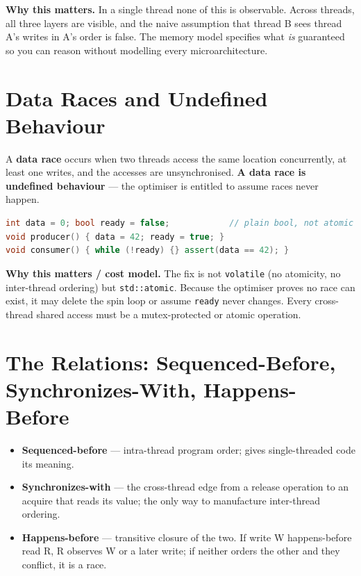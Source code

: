 \textbf{Why this matters.} In a single thread none of this is observable. Across threads, all three layers are visible, and the naive assumption that thread B sees thread A's writes in A's order is false. The memory model specifies what \emph{is} guaranteed so you can reason without modelling every microarchitecture.

\section{Data Races and Undefined Behaviour}
A \textbf{data race} occurs when two threads access the same location concurrently, at least one writes, and the accesses are unsynchronised. \textbf{A data race is undefined behaviour} --- the optimiser is entitled to assume races never happen.

\begin{lstlisting}[language=C++, caption={A textbook data race (buggy). Min standard: C++11.}]
int data = 0; bool ready = false;            // plain bool, not atomic
void producer() { data = 42; ready = true; }
void consumer() { while (!ready) {} assert(data == 42); }
\end{lstlisting}

\textbf{Why this matters / cost model.} The fix is not \texttt{volatile} (no atomicity, no inter-thread ordering) but \texttt{std::atomic}. Because the optimiser proves no race can exist, it may delete the spin loop or assume \texttt{ready} never changes. Every cross-thread shared access must be a mutex-protected or atomic operation.

\section{The Relations: Sequenced-Before, Synchronizes-With, Happens-Before}
\begin{itemize}
\item \textbf{Sequenced-before} --- intra-thread program order; gives single-threaded code its meaning.
\item \textbf{Synchronizes-with} --- the cross-thread edge from a release operation to an acquire that reads its value; the only way to manufacture inter-thread ordering.
\item \textbf{Happens-before} --- transitive closure of the two. If write W happens-before read R, R observes W or a later write; if neither orders the other and they conflict, it is a race.
\end{itemize}

